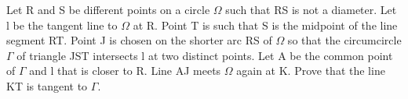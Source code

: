 \item Let R and S be different points on a circle $\Omega$ such that RS is not a diameter. Let l
be the tangent line to $\Omega$ at R. Point T is such that S is the midpoint of the line segment RT. Point J is chosen on the shorter arc RS of $\Omega$ so that the circumcircle $\Gamma$ of triangle JST intersects l at two distinct points. Let A be the common point of $\Gamma$ and l that is closer to R. Line AJ meets $\Omega$ again at K. Prove that the line KT is tangent to $\Gamma$.
